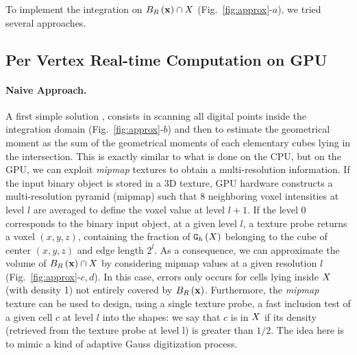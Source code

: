 \documentclass{llncs}
\begin{document}
\color{blue}
To implement the integration on $B_{R}\left(\mathbf{x}\right) \cap X$ (Fig.~\ref{fig:approx}-$a$), we tried several approaches.

\subsection{Per Vertex Real-time Computation on GPU}
\label{sec:hierarchical}

\paragraph{Naive Approach.}
A first simple solution , consists in scanning all digital
\normalcolor
points inside the integration domain (Fig.~\ref{fig:approx}-$b$) and then to estimate the
geometrical moment as the sum of the geometrical moments of each elementary
cubes lying in the intersection. 
\color{blue}
This is exactly similar to what is done on the CPU, but on the GPU, we can
exploit \emph{mipmap} textures to obtain a multi-resolution information.
\normalcolor
If the input binary object is stored in a
3D texture, GPU hardware constructs a multi-resolution pyramid (mipmap) such that 8
neighboring voxel intensities at level $l$ are averaged to define the voxel
value at level $l+1$. If the level 0 corresponds to the binary input object, at
\color{blue}
a given level $l$, a texture probe returns a voxel $(x,y,z)$, containing the fraction of $\mathtt{G}_{h}\left(X\right)$ belonging
\normalcolor
to the cube of center $(x,y,z)$ and edge length $2^l$. As a consequence, we can
approximate the volume of $B_{R}\left(\mathbf{x}\right)\cap X$ by considering mipmap values
at a given resolution $l$ (Fig.~\ref{fig:approx}-$c,d$). In this case, errors only
occurs for cells lying inside $X$ (with density 1) not entirely covered by
$B_{R}\left(\mathbf{x}\right)$. Furthermore, the \emph{mipmap} texture can be used to design,
using a single texture probe, a fast inclusion test of a given cell $c$ at level
$l$ into the shapes: we say that $c$ is in $X$ if its density (retrieved
from the texture probe at level l) is greater than $1/2$. The idea here is to
mimic a kind of adaptive Gauss digitization process.
\end{document}
